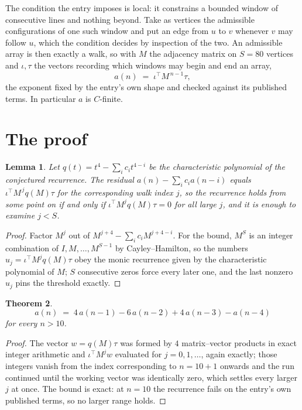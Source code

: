 \documentclass[11pt,a4paper]{article}
\theoremstyle{plain}
\newtheorem{theorem}{Theorem}
\newtheorem{lemma}[theorem]{Lemma}
\theoremstyle{definition}
\begin{document}
The condition the entry imposes is local: it constrains a bounded window of consecutive lines and nothing beyond. Take as
vertices the admissible configurations of one such window and put an edge from $u$ to $v$
whenever $v$ may follow $u$, which the condition decides by inspection of the two. An
admissible array is then exactly a walk, so with $M$ the adjacency matrix on $S=80$ vertices
and $\iota,\tau$ the vectors recording which windows may begin and end an array,
\[
a(n)\;=\;\iota^{\!\top}M^{\,n-1}\tau ,
\]
the exponent fixed by the entry's own shape and checked against its published terms. In
particular $a$ is $C$-finite.

\section{The proof}

\begin{lemma}\label{lem:crit}
Let $q(t)=t^{4}-\sum_i c_it^{4-i}$ be the characteristic polynomial of the
conjectured recurrence. The residual $a(n)-\sum_ic_ia(n-i)$ equals
$\iota^{\!\top}M^{\,j}q(M)\tau$ for the corresponding walk index $j$, so the recurrence
holds from some point on if and only if $\iota^{\!\top}M^{j}q(M)\tau=0$ for all large $j$,
and it is enough to examine $j<S$.
\end{lemma}

\begin{proof}
Factor $M^{j}$ out of $M^{j+4}-\sum_ic_iM^{j+4-i}$. For the bound, $M^{S}$
is an integer combination of $I,M,\dots,M^{S-1}$ by Cayley--Hamilton, so the numbers
$u_j=\iota^{\!\top}M^{j}q(M)\tau$ obey the monic recurrence given by the characteristic
polynomial of $M$; $S$ consecutive zeros force every later one, and the last nonzero $u_j$
pins the threshold exactly.
\end{proof}

\begin{theorem}
\[
a(n)\;=\;4\,a(n-1) - 6\,a(n-2) + 4\,a(n-3) - a(n-4)
\]
for every $n>10$.
\end{theorem}

\begin{proof}
The vector $w=q(M)\tau$ was formed by $4$ matrix--vector products in exact integer
arithmetic and $\iota^{\!\top}M^{j}w$ evaluated for $j=0,1,\dots$, again exactly; those
integers vanish from the index corresponding to $n=10+1$ onwards and the run continued
until the working vector was identically zero, which settles every larger $j$ at once. The bound is exact: at $n=10$ the recurrence fails on the entry's own published terms, so no larger range holds.
\end{proof}
\end{document}

